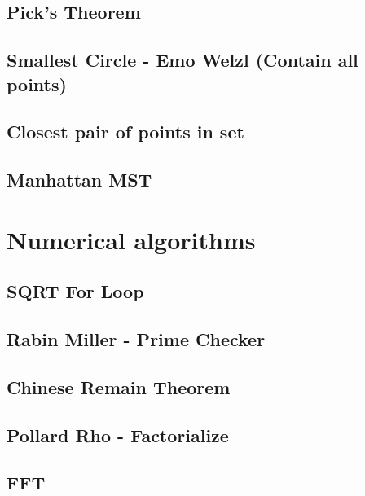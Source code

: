 \subsection{Pick's Theorem}
\raggedbottom
\hrulefill
\subsection{Smallest Circle - Emo Welzl (Contain all points)}
\raggedbottom
\hrulefill
\subsection{Closest pair of points in set}
\raggedbottom
\hrulefill
\subsection{Manhattan MST}
\raggedbottom
\hrulefill

\section{Numerical algorithms}
\subsection{SQRT For Loop}
\raggedbottom
\hrulefill
\subsection{Rabin Miller - Prime Checker}
\raggedbottom
\hrulefill
\subsection{Chinese Remain Theorem}
\raggedbottom
\hrulefill
\subsection{Pollard Rho - Factorialize}
\raggedbottom
\hrulefill
\subsection{FFT}
\raggedbottom
\hrulefill
